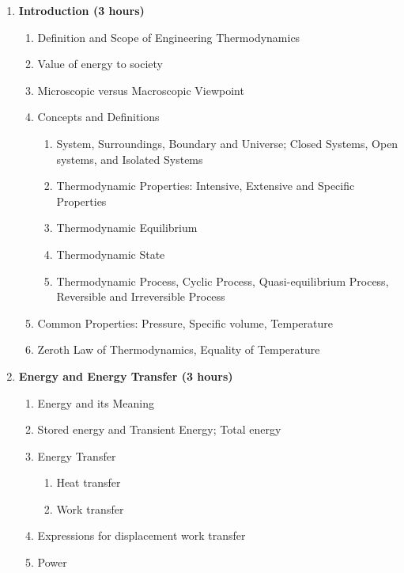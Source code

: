 \begin{enumerate}
    \item \textbf{Introduction \hfill (3 hours)}
    \begin{enumerate}
        \item Definition and Scope of Engineering Thermodynamics 
        \item Value of energy to society
        \item Microscopic versus Macroscopic Viewpoint
        \item Concepts and Definitions
        \begin{enumerate}
            \item System, Surroundings, Boundary and Universe; Closed Systems, Open systems, and Isolated Systems
            \item Thermodynamic Properties: Intensive, Extensive and Specific Properties
            \item Thermodynamic Equilibrium
            \item Thermodynamic State
            \item Thermodynamic Process, Cyclic Process, Quasi-equilibrium Process, Reversible and Irreversible Process
        \end{enumerate}
        \item Common Properties: Pressure, Specific volume, Temperature
        \item Zeroth Law of Thermodynamics, Equality of Temperature
    \end{enumerate}
    
    \item \textbf{Energy and Energy Transfer \hfill (3 hours)}
    \begin{enumerate}
        \item Energy and its Meaning
        \item Stored energy and Transient Energy; Total energy
        \item Energy Transfer
        \begin{enumerate}
            \item Heat transfer
            \item Work transfer
        \end{enumerate}
        \item Expressions for displacement work transfer
        \item Power
    \end{enumerate}
    

\end{enumerate}
